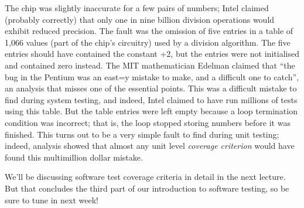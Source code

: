 The chip was slightly inaccurate for a few pairs of numbers; Intel claimed
(probably correctly) that only one in nine billion division operations would
exhibit reduced precision. The fault was the omission of five entries in a table
of 1,066 values (part of the chip's circuitry) used by a division algorithm. The
five entries should have contained the constant +2, but the entries were not
initialised and contained zero instead. The MIT mathematician Edelman claimed
that ``the bug in the Pentium was an east=y mistake to make, and a difficult one
to catch'', an analysis that misses one of the essential points. This was a
difficult mistake to find during system testing, and indeed, Intel claimed to
have run millions of tests using this table. But the table entries were left
empty because a loop termination condition was incorrect; that is, the loop
stopped storing numbers before it was finished. This turns out to be a very
simple fault to find during unit testing; indeed, analysis showed that almost
any unit level {\it coverage criterion} would have found this multimillion dollar
mistake. 


We'll be discussing software test coverage criteria in detail in the next
lecture.
%
But that concludes the third part of our introduction to software testing, so
be sure to tune in next week!

